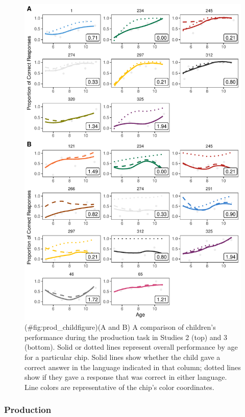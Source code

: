 \documentclass[,man,floatsintext]{apa6}
\theoremstyle{definition}
\theoremstyle{definition}
\theoremstyle{definition}
\theoremstyle{remark}
\begin{document}
\begin{figure}
\centering
\includegraphics{amazon_color_files/figure-latex/prod_childfigure-1.pdf}
\caption{(\#fig:prod\_childfigure)(A and B) A comparison of children's
performance during the production task in Studies 2 (top) and 3
(bottom). Solid or dotted lines represent overall performance by age for
a particular chip. Solid lines show whether the child gave a correct
answer in the language indicated in that column; dotted lines show if
they gave a response that was correct in either language. Line colors
are representative of the chip's color coordinates.}
\end{figure}

\subsubsection{Production}\label{production}
\end{document}
